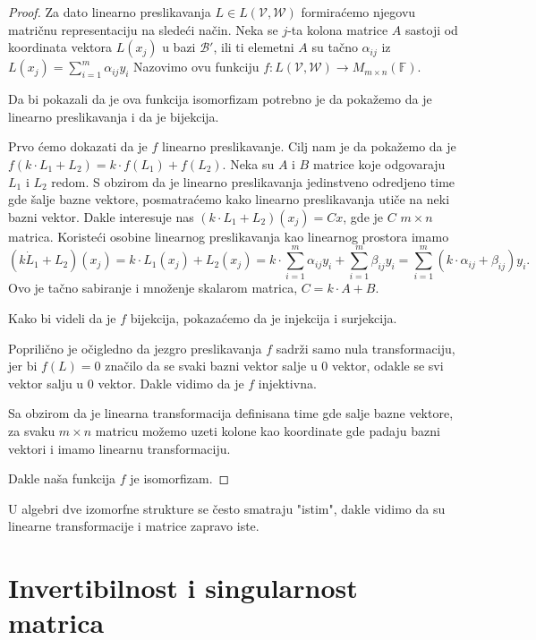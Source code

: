 \documentclass{article}
\begin{document}
\begin{proof}
  Za dato linearno preslikavanja $L \in L(\mathcal{V}, \mathcal{W})$ formiraćemo njegovu matričnu representaciju na sledeći način.
  Neka se $j$-ta kolona matrice $A$ sastoji od koordinata vektora $L(x_j)$ u bazi $\mathcal{B}'$, ili ti elemetni $A$ su tačno $\alpha_{ij}$ iz $L(x_j) = \sum_{i = 1}^{m} \alpha_{ij} y_i$
  Nazovimo ovu funkciju $f : L(\mathcal{V}, \mathcal{W}) \to M_{m \times n} (\mathbb{F})$.

  Da bi pokazali da je ova funkcija isomorfizam potrebno je da pokažemo da je linearno preslikavanja i da je bijekcija.
  
  Prvo ćemo dokazati da je $f$ linearno preslikavanje.
  Cilj nam je da pokažemo da je $f(k \cdot L_1 + L_2) = k \cdot f(L_1) + f(L_2)$.
  Neka su $A$ i $B$ matrice koje odgovaraju $L_1$ i $L_2$ redom.
  S obzirom da je linearno preslikavanja jedinstveno odredjeno time gde šalje bazne vektore, posmatraćemo kako linearno preslikavanja utiče na neki bazni vektor.
  Dakle interesuje nas $(k \cdot L_1 + L_2)(x_j) = Cx$, gde je $C$ $m \times n$ matrica.
  Koristeći osobine linearnog preslikavanja kao linearnog prostora imamo
  \[(k \dot L_1 + L_2)(x_j) = k \cdot L_1(x_j) + L_2(x_j) = k \cdot \sum_{i = 1}^{m} \alpha_{ij} y_i + \sum_{i = 1}^{m} \beta_{ij} y_i = \sum_{i = 1}^{m} (k \cdot \alpha_{ij} + \beta_{ij}) y_i.\]
  Ovo je tačno sabiranje i množenje skalarom matrica, $C = k \cdot A + B$.
  

  Kako bi videli da je $f$ bijekcija, pokazaćemo da je injekcija i surjekcija.

  Poprilično je očigledno da jezgro preslikavanja $f$ sadrži samo nula transformaciju, jer bi $f(L) = 0$ značilo da se svaki bazni vektor salje u $0$ vektor, odakle se svi vektor salju u $0$ vektor.
  Dakle vidimo da je $f$ injektivna.

  Sa obzirom da je linearna transformacija definisana time gde salje bazne vektore, za svaku $m \times n$ matricu možemo uzeti kolone kao koordinate gde padaju bazni vektori i imamo linearnu transformaciju.

  Dakle naša funkcija $f$ je isomorfizam.
\end{proof}

U algebri dve izomorfne strukture se često smatraju "istim", dakle vidimo da su linearne transformacije i matrice zapravo iste.

\section{Invertibilnost i singularnost matrica}
\end{document}

